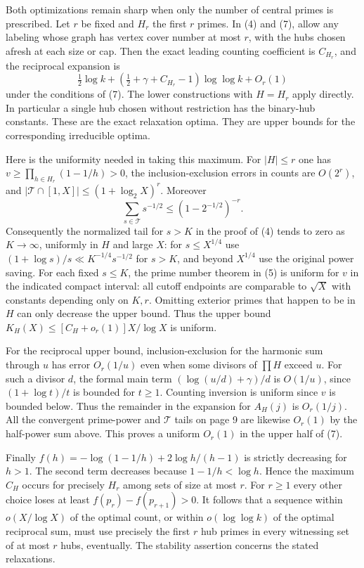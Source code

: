 \newpage
{}
Both optimizations remain sharp when only the number of central primes is prescribed. Let $r$ be fixed and $H_r$ the first $r$ primes. In (4) and (7), allow any labeling whose graph has vertex cover number at most $r$, with the hubs chosen afresh at each size or cap. Then the exact leading counting coefficient is $C_{H_r}$, and the reciprocal expansion is
\[
 \tfrac12\log k+(\tfrac12+\gamma+C_{H_r}-1)\log\log k+O_r(1)
\]
under the conditions of (7). The lower constructions with $H=H_r$ apply directly. In particular a single hub chosen without restriction has the binary-hub constants. These are the exact relaxation optima. They are upper bounds for the corresponding irreducible optima.

Here is the uniformity needed in taking this maximum. For $|H|\le r$ one has $v\ge\prod_{h\in H_r}(1-1/h)>0$, the inclusion-exclusion errors in counts are $O(2^r)$, and $|\mathcal T\cap[1,X]|\le(1+\log_2 X)^r$. Moreover
\[
 \sum_{s\in\mathcal T}s^{-1/2}\le (1-2^{-1/2})^{-r}.
\]
Consequently the normalized tail for $s>K$ in the proof of (4) tends to zero as $K\to\infty$, uniformly in $H$ and large $X$: for $s\le X^{1/4}$ use $(1+\log s)/s\ll K^{-1/4}s^{-1/2}$ for $s>K$, and beyond $X^{1/4}$ use the original power saving. For each fixed $s\le K$, the prime number theorem in (5) is uniform for $v$ in the indicated compact interval: all cutoff endpoints are comparable to $\sqrt X$ with constants depending only on $K,r$. Omitting exterior primes that happen to be in $H$ can only decrease the upper bound. Thus the upper bound $K_H(X)\le [C_H+o_r(1)]X/\log X$ is uniform.

For the reciprocal upper bound, inclusion-exclusion for the harmonic sum through $u$ has error $O_r(1/u)$ even when some divisors of $\prod H$ exceed $u$. For such a divisor $d$, the formal main term $(\log(u/d)+\gamma)/d$ is $O(1/u)$, since $(1+\log t)/t$ is bounded for $t\ge1$. Counting inversion is uniform since $v$ is bounded below. Thus the remainder in the expansion for $A_H(j)$ is $O_r(1/j)$. All the convergent prime-power and $\mathcal T$ tails on page 9 are likewise $O_r(1)$ by the half-power sum above. This proves a uniform $O_r(1)$ in the upper half of (7).

Finally $f(h)=-\log(1-1/h)+2\log h/(h-1)$ is strictly decreasing for $h>1$. The second term decreases because $1-1/h<\log h$. Hence the maximum $C_H$ occurs for precisely $H_r$ among sets of size at most $r$. For $r\ge1$ every other choice loses at least $f(p_r)-f(p_{r+1})>0$. It follows that a sequence within $o(X/\log X)$ of the optimal count, or within $o(\log\log k)$ of the optimal reciprocal sum, must use precisely the first $r$ hub primes in every witnessing set of at most $r$ hubs, eventually. The stability assertion concerns the stated relaxations.
